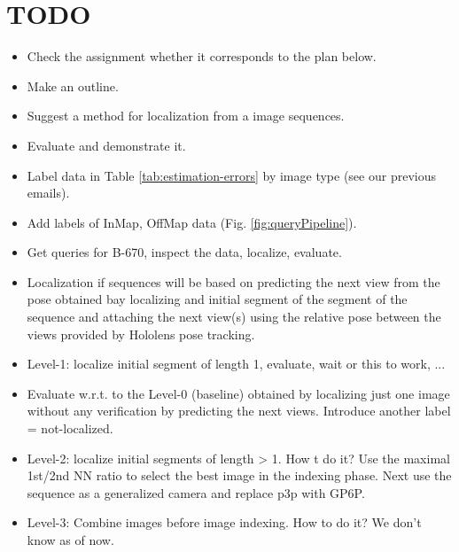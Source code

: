 \documentclass[twoside]{ctuthesis}
\theoremstyle{plain}
\theoremstyle{definition}
\theoremstyle{note}
\begin{document}
\maketitle

\chapter{TODO}

\begin{itemize}
    \item Check the assignment whether it corresponds to the plan below.
    \item Make an outline.
    \item Suggest a method for localization from a image sequences.
    \item Evaluate and demonstrate it.
    \item Label data in Table \ref{tab:estimation-errors} by image type (see our previous emails).
    \item Add labels of InMap, OffMap data (Fig. \ref{fig:queryPipeline}).
    \item Get queries for B-670, inspect the data, localize, evaluate.
    \item Localization if sequences will be based on predicting the next view from the pose obtained bay localizing and initial segment of the segment of the sequence and attaching the next view(s) using the relative pose between the views provided by Hololens pose tracking. 
    \item Level-1: localize initial segment of length 1, evaluate, wait or this to work, ...
    \item Evaluate w.r.t. to the Level-0 (baseline) obtained by localizing just one image without any verification by predicting the next views. Introduce another label = not-localized.
    \item Level-2: localize initial segments of length > 1. How t do it? Use the maximal 1st/2nd NN ratio to select the best image in the indexing phase. Next use the sequence as a generalized camera and replace p3p with GP6P. 
    \item Level-3: Combine images before image indexing. How to do it? We don't know as of now.
\end{itemize}

\end{document}

